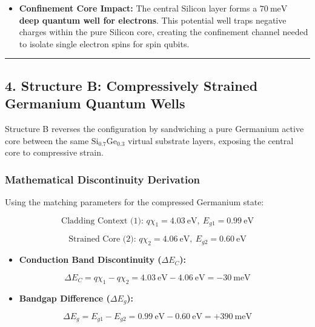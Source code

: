 \documentclass[
]{article}
\providecommand{\tightlist}{%
  \setlength{\itemsep}{0pt}\setlength{\parskip}{0pt}}
\begin{document}
\begin{itemize}
\tightlist
\item
  \textbf{Confinement Core Impact:} The central Silicon layer forms a
  \textbf{\(70\ \text{meV}\) deep quantum well for electrons}. This
  potential well traps negative charges within the pure Silicon core,
  creating the confinement channel needed to isolate single electron
  spins for spin qubits.
\end{itemize}

\begin{center}\rule{0.5\linewidth}{0.5pt}\end{center}

\subsection{4. Structure B: Compressively Strained Germanium Quantum
Wells}\label{structure-b-compressively-strained-germanium-quantum-wells}

Structure B reverses the configuration by sandwiching a pure Germanium
active core between the same \(\text{Si}_{0.7}\text{Ge}_{0.3}\) virtual
substrate layers, exposing the central core to compressive strain.

\subsubsection{Mathematical Discontinuity
Derivation}\label{mathematical-discontinuity-derivation-1}

Using the matching parameters for the compressed Germanium state:

\[\text{Cladding Context (1): } q\chi_1 = 4.03\ \text{eV}, \ E_{g1} = 0.99\ \text{eV}\]

\[\text{Strained Core (2): } q\chi_2 = 4.06\ \text{eV}, \ E_{g2} = 0.60\ \text{eV}\]

\begin{itemize}
\tightlist
\item
  \textbf{Conduction Band Discontinuity (\(\Delta E_C\)):}
\end{itemize}

\[\Delta E_C = q\chi_1 - q\chi_2 = 4.03\ \text{eV} - 4.06\ \text{eV} = -30\ \text{meV}\]

\begin{itemize}
\tightlist
\item
  \textbf{Bandgap Difference (\(\Delta E_g\)):}
\end{itemize}

\[\Delta E_g = E_{g1} - E_{g2} = 0.99\ \text{eV} - 0.60\ \text{eV} = +390\ \text{meV}\]
\end{document}
